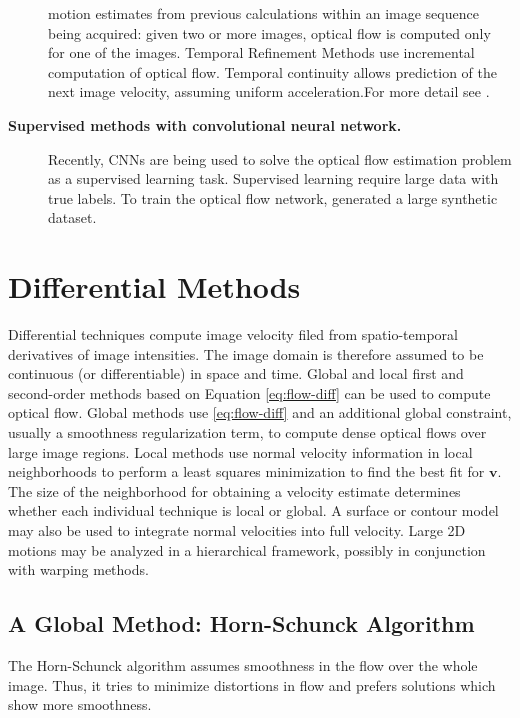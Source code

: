 \documentclass[letterpaper,11pt]{article}
\begin{document}
\begin{description}
motion estimates from previous calculations within an image sequence being acquired: given two or more images, optical flow is computed only for one of the images. Temporal Refinement Methods use incremental computation of optical flow. Temporal continuity allows prediction of the next image velocity, assuming uniform acceleration.For more detail see \citep{Beauchemin:1995}. 
\item[\bf{Supervised methods with convolutional neural network}.]  Recently, CNNs are being used to solve
the optical flow estimation problem as a supervised learning task. Supervised learning require large data with true labels. To train the optical flow network, \citep{FlowNet:2015} generated a large synthetic dataset. 
\end{description}

\section{Differential Methods}
\label{sec:diff-methods}
Differential techniques compute image velocity filed from spatio-temporal derivatives of image intensities. The image domain
is therefore assumed to be continuous (or differentiable) in space and time. Global and local first and second-order methods
based on Equation \eqref{eq:flow-diff} can be used to compute optical flow. Global methods use
\eqref{eq:flow-diff} and an additional global constraint, usually a smoothness regularization term, to compute dense optical flows over
large image regions. Local methods use normal velocity information in local neighborhoods to perform a least squares minimization to find the best fit for $\mathbf{v}$.
The size of the neighborhood for obtaining a velocity estimate determines whether each individual technique is local or global. A surface or contour model may also be used to integrate normal velocities into full velocity. Large 2D motions may be analyzed in a hierarchical framework, possibly in conjunction with warping methods.

\subsection{A Global Method: Horn-Schunck Algorithm}
\label{sec:Horn-Schunck}
The Horn-Schunck algorithm \citep{Horn:Schunck:1981} assumes smoothness in the flow over the whole image. Thus, it tries to minimize distortions in flow and prefers solutions which show more smoothness.
\end{document}
